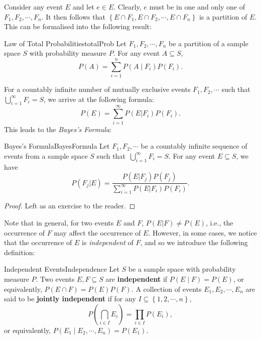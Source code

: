 \documentclass[math]{amznotes}
\theoremstyle{remark}
\newcommand{\0}{\mathbf{0}}
\newcommand{\1}{\mathbf{1}}
\begin{document}
Consider any event $E$ and let $e \in E$. Clearly, $e$ must be in one and only one of $F_1, F_2, \cdots, F_n$. It then follows that $\left\{E \cap F_1, E \cap F_2, \cdots, E \cap F_n\right\}$ is a partition of $E$. This can be formalised into the following result:
\begin{thmbox}{Law of Total Probabilities}{totalProb}
    Let $F_1, F_2, \cdots, F_n$ be a partition of a sample space $S$ with probability measure $P$. For any event $A \subseteq S$, 
    \begin{equation*}
        P\left(A\right) = \sum_{i = 1}^{n}P\left(A \mid F_i\right)P\left(F_i\right).
    \end{equation*}
\end{thmbox} 
For a countably infinite number of mutually exclusive events $F_1, F_2, \cdots$ such that $\bigcup_{i = 1}^\infty F_i = S$, we arrive at the following formula:
\begin{equation*}
    P(E) = \sum_{i = 1}^{\infty}P(E|F_i)P(F_i).
\end{equation*}
This leads to the \textit{Bayes's Formula}:
\begin{thmbox}{Bayes's Formula}{BayesFormula}
    Let $F_1, F_2, \cdots$ be a countably infinite sequence of events from a sample space $S$ such that~$\bigcup_{i = 1}^\infty F_i = S$. For any event $E \subseteq S$, we have
    \begin{equation*}
        P(F_j|E) = \frac{P(E|F_j)P(F_j)}{\sum_{i = 1}^{\infty}P(E|F_i)P(F_i)}.
    \end{equation*}
    \tcblower
    \begin{proof}
        Left as an exercise to the reader.
    \end{proof}
\end{thmbox}
Note that in general, for two events $E$ and $F$, $P(E|F) \neq P(E)$, i.e., the occurrence of $F$ may affect the occurrence of $E$. However, in some cases, we notice that the occurrence of $E$ is \textit{independent} of $F$, and so we introduce the following definition:
\begin{dfnbox}{Independent Events}{Independence}
    Let $S$ be a sample space with probability measure $P$. Two events $E, F \subseteq S$ are {\color{red} \textbf{independent}} if $P\left(E \mid F\right) = P\left(E\right)$, or equivalently, $P\left(E \cap F\right) = P\left(E\right)P\left(F\right)$. A collection of events $E_1, E_2, \cdots, E_n$ are said to be {\color{red} \textbf{jointly independent}} if for any $I \subseteq \left\{1, 2, \cdots, n\right\}$, 
    \begin{equation*}
        P\left(\bigcap_{i \in I}E_i\right) = \prod_{i \in I}P\left(E_i\right),
    \end{equation*}
    or equivalently, $P\left(E_1 \mid E_2, \cdots, E_n\right) = P\left(E_1\right)$.
\end{dfnbox}
\end{document}
